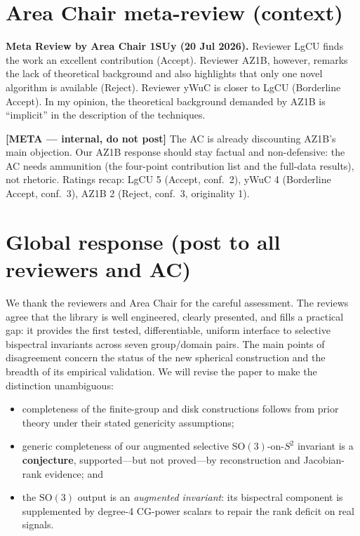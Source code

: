 \documentclass[10pt]{article}
\newenvironment{metacomment}%
  {\par\medskip\noindent\begingroup%
   \setlength{\fboxsep}{8pt}%
   \noindent\begin{lrbox}{\metabox}\begin{minipage}{\dimexpr\linewidth-2\fboxsep\relax}%
   \small\sffamily\color{metablue}%
   \textbf{[META --- internal, do not post]}\quad}%
  {\end{minipage}\end{lrbox}%
   \noindent\colorbox{metabg}{\usebox{\metabox}}\endgroup\par\medskip}
\newenvironment{reviewquote}%
  {\par\medskip\begingroup\color{reviewgray}\small%
   \list{}{\leftmargin=1.5em\rightmargin=1.5em}\item\relax}%
  {\endlist\endgroup\par\medskip}
\begin{document}
\tableofcontents

\section{Area Chair meta-review (context)}

\begin{reviewquote}
\textbf{Meta Review by Area Chair 1SUy (20 Jul 2026).}
Reviewer LgCU finds the work an excellent contribution (Accept). Reviewer
AZ1B, however, remarks the lack of theoretical background and also highlights
that only one novel algorithm is available (Reject). Reviewer yWuC is closer
to LgCU (Borderline Accept). In my opinion, the theoretical background
demanded by AZ1B is ``implicit'' in the description of the techniques.
\end{reviewquote}

\begin{metacomment}
The AC is already discounting AZ1B's main objection. Our AZ1B response should
stay factual and non-defensive: the AC needs ammunition (the four-point
contribution list and the full-data results), not rhetoric. Ratings recap:
LgCU 5 (Accept, conf.\ 2), yWuC 4 (Borderline Accept, conf.\ 3), AZ1B 2
(Reject, conf.\ 3, originality 1).
\end{metacomment}

\section{Global response (post to all reviewers and AC)}

We thank the reviewers and Area Chair for the careful assessment. The reviews
agree that the library is well engineered, clearly presented, and fills a
practical gap: it provides the first tested, differentiable, uniform interface
to selective bispectral invariants across seven group/domain pairs. The main
points of disagreement concern the status of the new spherical construction
and the breadth of its empirical validation. We will revise the paper to make
the distinction unambiguous:

\begin{itemize}
\item completeness of the finite-group and disk constructions follows from
  prior theory under their stated genericity assumptions;
\item generic completeness of our augmented selective
  $\mathrm{SO}(3)$-on-$S^2$ invariant is a \textbf{conjecture},
  supported---but not proved---by reconstruction and Jacobian-rank evidence;
  and
\item the $\mathrm{SO}(3)$ output is an \emph{augmented invariant}: its
  bispectral component is supplemented by degree-4 CG-power scalars to repair
  the rank deficit on real signals.
\end{itemize}
\end{document}
